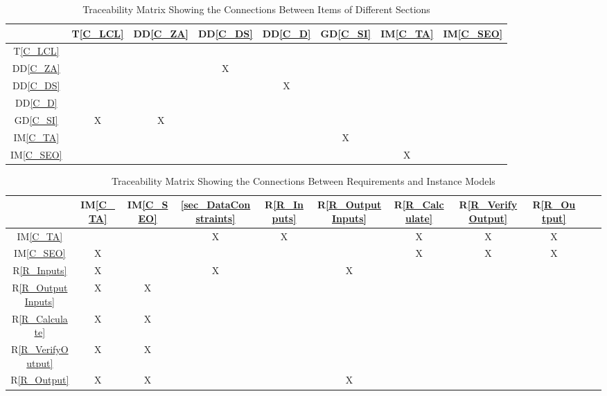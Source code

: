 \documentclass[12pt]{article}
\newcommand{\dref}[1]{GD\ref{#1}}
\newcommand{\ddref}[1]{DD\ref{#1}}
\newcommand{\tref}[1]{T\ref{#1}}
\newcommand{\iref}[1]{IM\ref{#1}}
\newcommand{\rref}[1]{R\ref{#1}}
\begin{document}
\begin{table}[h!]
\centering
\begin{tabular}{|c|c|c|c|c|c|c|c|}
\hline        
& \tref{C_LCL}& \ddref{C_ZA} & \ddref{C_DS}&\ddref{C_D} & \dref{C_SI}
&\iref{C_TA} &\iref{C_SEO} \\
\hline
\tref{C_LCL}        &    &    &     &    &    &    &     \\ \hline
\ddref{C_ZA}       &    &    & X  &    &    &    &      \\ \hline
\ddref{C_DS}       &    &    &     & X &    &    &     \\ \hline
\ddref{C_D}         &    &    &     &    &    &    &     \\ \hline
\dref{C_SI}          & X & X &     &    &    &    &       \\ \hline
\iref{C_TA}          &    &     &     &    & X &    &      \\ \hline
\iref{C_SEO}       &    &     &     &    &    & X &        \\ \hline


\hline
\end{tabular}
\caption{Traceability Matrix Showing the Connections Between Items of Different
Sections}
\label{Table:trace}
\end{table}

\begin{table}[h!]
\centering
\begin{tabular}{|c|c|c|c|c|c|c|c|c|c|c|}
\hline
& \iref{C_TA} & \iref{C_SEO}& \ref{sec_DataConstraints}& \rref{R_Inputs}&
\rref{R_OutputInputs} & \rref{R_Calculate}& \rref{R_VerifyOutput}&
\rref{R_Output}\\

\hline
\iref{C_TA}         				&    &    & X & X &     & X  & X  &X \\ \hline
\iref{C_SEO}           		& X &    &    &    &     & X  & X  &X \\ \hline
\rref{R_Inputs}    				& X &    & X &    & X  &     &     &     \\ \hline
\rref{R_OutputInputs}  & X & X &    &    &     &     &     &     \\ \hline
\rref{R_Calculate}  		& X & X &    &    &     &     &     &     \\ \hline
\rref{R_VerifyOutput}  & X & X &    &    &     &      &     &    \\ \hline 
\rref{R_Output}       		& X & X &    &    & X &      &     &    \\ \hline
\hline
\end{tabular}
\caption{Traceability Matrix Showing the Connections Between Requirements and
Instance Models}
\label{Table:R_trace}
\end{table}
\end{document}

